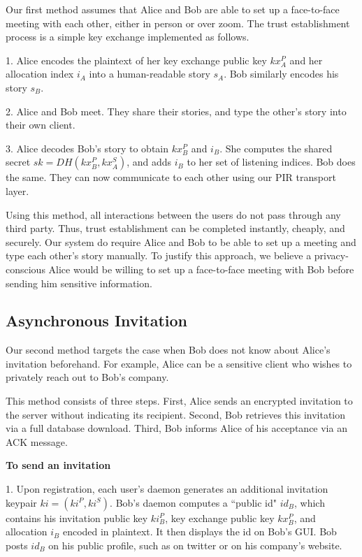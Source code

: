 Our first method assumes that Alice and Bob are able to set up a face-to-face meeting with each other, either in person or over zoom. The trust establishment process is a simple key exchange implemented as follows.

1. Alice encodes the plaintext of her key exchange public key $kx_A^P$ and her allocation index $i_A$ into a human-readable story $s_A$. Bob similarly encodes his story $s_B$.

2. Alice and Bob meet. They share their stories, and type the other's story into their own client. 

3. Alice decodes Bob's story to obtain $kx^P_B$ and $i_B$. She computes the shared secret $sk = DH(kx^P_B, kx^S_A)$, and adds $i_B$ to her set of listening indices. Bob does the same. They can now communicate to each other using our PIR transport layer.

Using this method, all interactions between the users do not pass through any third party. Thus, trust establishment can be completed instantly, cheaply, and securely. Our system do require Alice and Bob to be able to set up a meeting and type each other's story manually. To justify this approach, we believe a privacy-conscious Alice would be willing to set up a face-to-face meeting with Bob before sending him sensitive information.

\subsection{Asynchronous Invitation}


Our second method targets the case when Bob does not know about Alice's invitation beforehand. For example, Alice can be a sensitive client who wishes to privately reach out to Bob's company. 

This method consists of three steps. First, Alice sends an encrypted invitation to the server without indicating its recipient. Second, Bob retrieves this invitation via a full database download. Third, Bob informs Alice of his acceptance via an ACK message.

\textbf{To send an invitation}

1. Upon registration, each user's daemon generates an additional invitation keypair $ki = (ki^P, ki^S)$. Bob's daemon computes a ``public id" $id_B$, which contains his invitation public key $ki_B^P$, key exchange public key $kx_B^P$, and allocation $i_B$ encoded in plaintext. It then displays the id on Bob's GUI. Bob posts $id_B$ on his public profile, such as on twitter or on his company's website.

